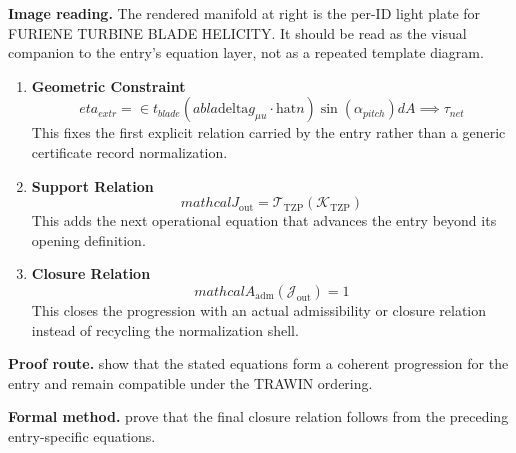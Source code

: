 \begin{samepage}
\noindent\begin{minipage}[t]{0.45\linewidth}
\vspace{0pt}
\raggedright
\scriptsize\textbf{Image reading.} The rendered manifold at right is the per-ID light plate for FURIENE TURBINE BLADE HELICITY. It should be read as the visual companion to the entry's equation layer, not as a repeated template diagram.\par
\end{minipage}\hfill
\begin{minipage}[t]{0.53\linewidth}
\vspace*{-0.10in}
\raggedright
{}
\end{minipage}
\end{samepage}

\clearpage


\begin{enumerate}[leftmargin=1.6em,itemsep=9pt,topsep=6pt]
\item \textbf{Geometric Constraint}
\[
eta_{extr} = \in t_{blade} ( abla \mathrm{delta} g_{\mu u} \cdot \mathrm{hat}{n}) \sin(\alpha_{pitch}) dA \implies \tau_{net}
\]
This fixes the first explicit relation carried by the entry rather than a generic certificate record normalization.

\item \textbf{Support Relation}
\[
mathcal{J}_{\mathrm{out}} = \mathcal{T}_{\mathrm{TZP}}\!\left(\mathcal{K}_{\mathrm{TZP}}\right)
\]
This adds the next operational equation that advances the entry beyond its opening definition.

\item \textbf{Closure Relation}
\[
mathcal{A}_{\mathrm{adm}}\!\left(\mathcal{J}_{\mathrm{out}}\right)=1
\]
This closes the progression with an actual admissibility or closure relation instead of recycling the normalization shell.
\end{enumerate}

\textbf{Proof route.} show that the stated equations form a coherent progression for the entry and remain compatible under the TRAWIN ordering.

\textbf{Formal method.} prove that the final closure relation follows from the preceding entry-specific equations.

